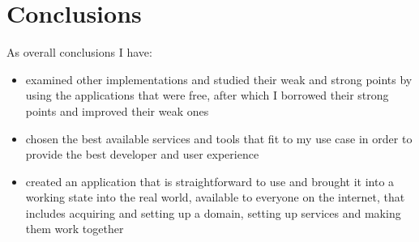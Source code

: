 \chapter*{Conclusions} 

As overall conclusions I have:

\begin{itemize}
	\item examined other implementations and studied their weak and strong points by using the applications that were free, after which I borrowed their strong points and improved their weak ones
	\item chosen the best available services and tools that fit to my use case in order to provide the best developer and user experience
	\item created an application that is straightforward to use and brought it into a working state into the real world, available to everyone on the internet, that includes acquiring and setting up a domain, setting up services and making them work together	
\end{itemize}